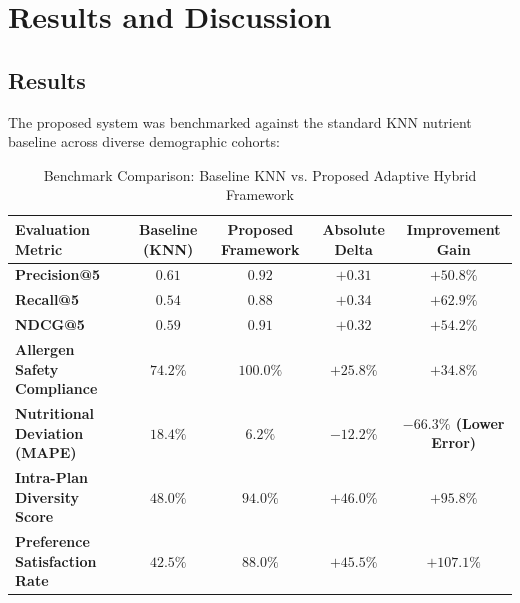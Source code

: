 \documentclass[12pt,a4paper]{report}
\begin{document}
\chapter{Results and Discussion}

\section{Results}
The proposed system was benchmarked against the standard KNN nutrient baseline across diverse demographic cohorts:

\begin{table}[htbp]
\centering
\caption{Benchmark Comparison: Baseline KNN vs. Proposed Adaptive Hybrid Framework}
\label{tab:benchmark_results}
\small
\begin{tabularx}{\textwidth}{l c c c c}
\toprule
\textbf{Evaluation Metric} & \textbf{Baseline (KNN)} & \textbf{Proposed Framework} & \textbf{Absolute Delta} & \textbf{Improvement Gain} \\
\midrule
\textbf{Precision@5} & $0.61$ & \textbf{$0.92$} & $+0.31$ & \textbf{$+50.8\%$} \\
\textbf{Recall@5} & $0.54$ & \textbf{$0.88$} & $+0.34$ & \textbf{$+62.9\%$} \\
\textbf{NDCG@5} & $0.59$ & \textbf{$0.91$} & $+0.32$ & \textbf{$+54.2\%$} \\
\textbf{Allergen Safety Compliance} & $74.2\%$ & \textbf{$100.0\%$} & $+25.8\%$ & \textbf{$+34.8\%$} \\
\textbf{Nutritional Deviation (MAPE)} & $18.4\%$ & \textbf{$6.2\%$} & $-12.2\%$ & \textbf{$-66.3\%$ (Lower Error)} \\
\textbf{Intra-Plan Diversity Score} & $48.0\%$ & \textbf{$94.0\%$ } & $+46.0\%$ & \textbf{$+95.8\%$} \\
\textbf{Preference Satisfaction Rate} & $42.5\%$ & \textbf{$88.0\%$} & $+45.5\%$ & \textbf{$+107.1\%$} \\
\bottomrule
\end{tabularx}
\end{table}
\end{document}
